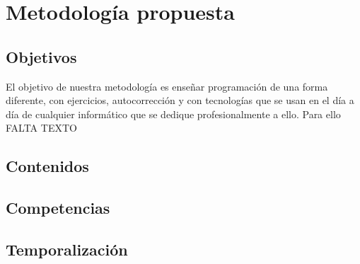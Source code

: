 \section{Metodología propuesta}


\subsection{Objetivos}

El objetivo de nuestra metodología es enseñar programación de una forma diferente, con ejercicios, autocorrección y con tecnologías que se usan en el día a día de cualquier informático que se dedique profesionalmente a ello. Para ello FALTA TEXTO

\subsection{Contenidos}

\subsection{Competencias}

\subsection{Temporalización}




